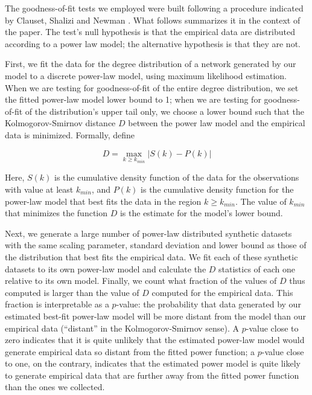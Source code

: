 \documentclass{article}
\begin{document}
The goodness-of-fit tests we employed were built following a procedure indicated by Clauset, Shalizi and Newman \cite[pp. 15-18]{clauset2009power}. What follows summarizes it in the context of the paper. The test's null hypothesis is that the empirical data are distributed according to a power law model; the alternative hypothesis is that they are not.

First, we fit the data for the degree distribution of a network generated by our model to a discrete power-law model, using maximum likelihood estimation. When we are testing for goodness-of-fit of the entire degree distribution, we set the fitted power-law model lower bound to 1; when we are testing for goodness-of-fit of the distribution's upper tail only, we choose a lower bound  such that the Kolmogorov-Smirnov distance $D$ between the power law model and the empirical data is minimized. Formally, define

$$D = \max_{k \geq k_{min}} | S(k) - P(k) |$$

Here, $S(k)$ is the cumulative density function of the data for the observations with value at least $k_{min}$, and $P(k)$ is the cumulative density function for the power-law model that best fits the data in the region $k \geq k_{min}$. The value of $k_{min}$ that minimizes the function $D$ is the estimate for the model's lower bound.

Next, we generate a large number of power-law distributed synthetic datasets with the same scaling parameter, standard deviation and lower bound as those of the distribution that best fits the empirical data. We fit each of these synthetic datasets to its own power-law model and calculate the $D$ statistics of each one relative to its own model. Finally, we count what fraction of the values of $D$ thus computed is larger than the value of $D$ computed for the empirical data. This fraction is interpretable as a $p$-value: the probability that data generated by our estimated best-fit power-law model will be more distant from the model than our empirical data (``distant'' in the Kolmogorov-Smirnov sense). A $p$-value close to zero indicates that it is quite unlikely that the estimated power-law model would generate empirical data so distant from the fitted power function; a $p$-value close to one, on the contrary, indicates that the estimated power model is quite likely to generate empirical data that are further away from the fitted power function than the ones we collected. 
\end{document}
